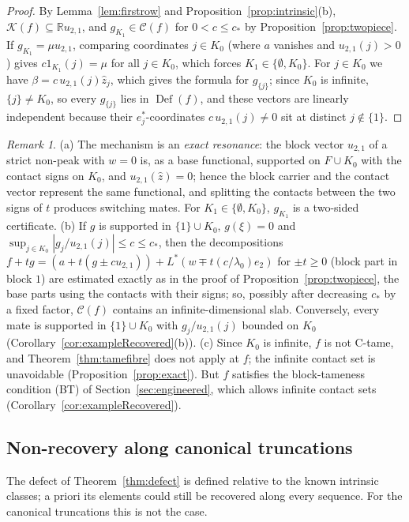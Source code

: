 \documentclass[10pt]{amsart}
\theoremstyle{definition}
\theoremstyle{remark}
\newtheorem{remark}[theorem]{Remark}
\newcommand{\R}{\mathbb R}
\newcommand{\Cset}{\mathcal C}
\newcommand{\Def}{\operatorname{Def}}
\newcommand{\zh}{\hat z}
\begin{document}
\begin{proof}
By Lemma~\ref{lem:firstrow} and Proposition~\ref{prop:intrinsic}(b),
$\mathcal K(f)\subseteq\R u_{2,1}$, and $g_{K_1}\in\Cset(f)$ for $0<c\le c_*$
by Proposition~\ref{prop:twopiece}.  If $g_{K_1}=\mu u_{2,1}$, comparing
coordinates $j\in K_0$ (where $a$ vanishes and $u_{2,1}(j)>0$) gives
$c1_{K_1}(j)=\mu$ for all $j\in K_0$, which forces $K_1\in\{\emptyset,K_0\}$.
For $j\in K_0$ we have $\beta=c\,u_{2,1}(j)\zh_j$, which gives the formula
for $g_{\{j\}}$; since $K_0$ is infinite, $\{j\}\ne K_0$, so every
$g_{\{j\}}$ lies in $\Def(f)$, and these vectors are linearly independent
because their $e_j^*$-coordinates $c\,u_{2,1}(j)\ne0$ sit at distinct
$j\notin\{1\}$.
\end{proof}

\begin{remark}\label{rem:twopiece}
(a) The mechanism is an \emph{exact resonance}: the block vector $u_{2,1}$
of a strict non-peak with $w=0$ is, as a base functional, supported on
$F\cup K_0$ with the contact signs on $K_0$, and $u_{2,1}(\zh)=0$; hence the
block carrier and the contact vector represent the same functional, and
splitting the contacts between the two signs of $t$ produces switching
mates.  For $K_1\in\{\emptyset,K_0\}$, $g_{K_1}$ is a two-sided certificate.
(b) If $g$ is supported in $\{1\}\cup K_0$, $g(\xi)=0$ and
$\sup_{j\in K_0}|g_j/u_{2,1}(j)|\le c\le c_*$, then the decompositions
$f+tg=(a+t(g\pm cu_{2,1}))+L^*(w\mp t(c/\lambda_0)e_2)$ for $\pm t\ge0$
(block part in block $1$) are estimated exactly as in the proof of
Proposition~\ref{prop:twopiece}, the base parts using the contacts with
their signs; so, possibly after decreasing $c_*$ by a fixed factor,
$\Cset(f)$ contains an infinite-dimensional slab.  Conversely, every mate is
supported in $\{1\}\cup K_0$ with $g_j/u_{2,1}(j)$ bounded on $K_0$
(Corollary~\ref{cor:exampleRecovered}(b)).
(c) Since $K_0$ is infinite, $f$ is not C-tame, and
Theorem~\ref{thm:tamefibre} does not apply at $f$; the infinite contact set
is unavoidable (Proposition~\ref{prop:exact}).  But $f$ satisfies the
block-tameness condition \textup{(BT)} of Section~\ref{sec:engineered},
which allows infinite contact sets (Corollary~\ref{cor:exampleRecovered}).
\end{remark}

\subsection{Non-recovery along canonical truncations}
The defect of Theorem~\ref{thm:defect} is defined relative to the known
intrinsic classes; a priori its elements could still be recovered along
every sequence.  For the canonical truncations this is not the case.
\end{document}
